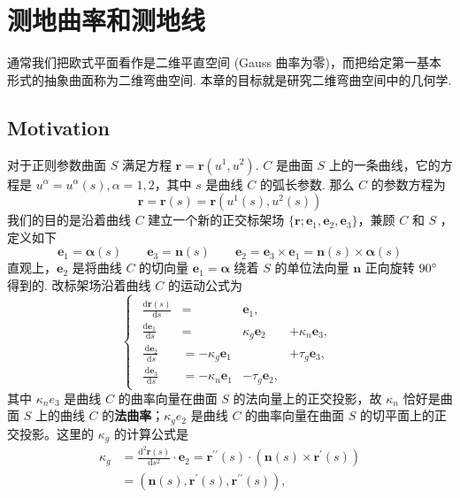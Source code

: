 \section{测地曲率和测地线}

通常我们把欧式平面看作是二维平直空间 (Gauss 曲率为零)，而把给定第一基本形式的抽象曲面称为二维弯曲空间. 本章的目标就是研究二维弯曲空间中的几何学.

\subsection{Motivation}

对于正则参数曲面 $S$ 满足方程 $\boldsymbol{r}=\boldsymbol{r}(u^{1},u^{2})$. $C$ 是曲面 $S$ 上的一条曲线，它的方程是 $u^{\alpha}=u^{\alpha}(s),\alpha=1,2$，其中 $s$ 是曲线 $C$ 的弧长参数. 那么 $C$ 的参数方程为
\[
\boldsymbol{r}=\boldsymbol{r}(s)=\boldsymbol{r}(u^{1}(s),u^{2}(s))
\]
我们的目的是沿着曲线 $C$ 建立一个新的正交标架场 $\{ \boldsymbol{r};\boldsymbol{e}_{1},\boldsymbol{e}_{2},\boldsymbol{e}_{3} \}$，兼顾 $C$ 和 $S$ ，定义如下
\[
\boldsymbol{e}_{1}=\boldsymbol{\alpha}(s)\qquad \boldsymbol{e}_{3}=\boldsymbol{n}(s)\qquad \boldsymbol{e}_{2}=\boldsymbol{e}_{3}\times \boldsymbol{e}_{1}=\boldsymbol{n}(s)\times\boldsymbol{\alpha}(s)
\]
直观上，$\boldsymbol{e}_{2}$ 是将曲线 $C$ 的切向量 $\boldsymbol{e}_{1}=\boldsymbol{\alpha}$ 绕着 $S$ 的单位法向量 $\boldsymbol{n}$ 正向旋转 $90^\circ$ 得到的. 改标架场沿着曲线 $C$ 的运动公式为
\[
\begin{cases}  
\begin{aligned}
\frac{\mathrm{d} \boldsymbol{r}(s)}{\mathrm{d} s} & = &  \boldsymbol{e}_1 , & \\
\frac{\mathrm{d} \boldsymbol{e}_1}{\mathrm{~d} s} & = & \kappa_g \boldsymbol{e}_2 & +\kappa_n \boldsymbol{e}_3, \\
\frac{\mathrm{~d} \boldsymbol{e}_2}{\mathrm{~d} s} & =-\kappa_g \boldsymbol{e}_1  &  & +\tau_g \boldsymbol{e}_3, \\
\frac{\mathrm{~d} \boldsymbol{e}_3}{\mathrm{~d} s} & =-\kappa_n \boldsymbol{e}_1 & -\tau_g \boldsymbol{e}_2, & 
\end{aligned}
\end{cases}
\]
其中 $\kappa_n e_3$ 是曲线 $C$ 的曲率向量在曲面 $S$ 的法向量上的正交投影，故 $\kappa_n$ 恰好是曲面 $S$ 上的曲线 $C$ 的\textbf{法曲率}；$\kappa_g e_2$ 是曲线 $C$ 的曲率向量在曲面 $S$ 的切平面上的正交投影。这里的 $\kappa_g$ 的计算公式是
\[
\begin{aligned}
\kappa_g & =\frac{\mathrm{d}^2 \boldsymbol{r}(s)}{\mathrm{d} s^2} \cdot \boldsymbol{e}_2=\boldsymbol{r}^{\prime \prime}(s) \cdot\left(\boldsymbol{n}(s) \times \boldsymbol{r}^{\prime}(s)\right) \\
& =\left(\boldsymbol{n}(s), \boldsymbol{r}^{\prime}(s), \boldsymbol{r}^{\prime \prime}(s)\right),
\end{aligned}
\]
